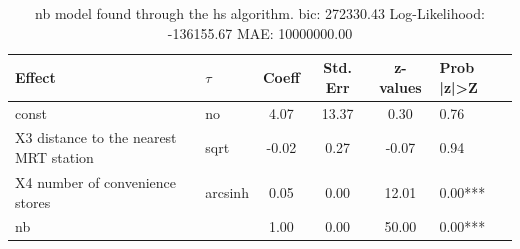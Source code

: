\begin{table}
	\caption{nb model found through the hs algorithm. bic: 272330.43 Log-Likelihood: -136155.67 MAE: 10000000.00}
	\begin{center}
		\begin{tabular}{|l|l|c|c|c|l|}
			\hline
			Effect & $\tau$ & Coeff & Std. Err & z-values & Prob |z|>Z \\
			\hline
			const & no & 4.07 & 13.37 & 0.30 & 0.76 \\
			\hline
			X3 distance to the nearest MRT station & sqrt & -0.02 & 0.27 & -0.07 & 0.94 \\
			\hline
			X4 number of convenience stores & arcsinh & 0.05 & 0.00 & 12.01 & 0.00*** \\
			\hline
			nb &  & 1.00 & 0.00 & 50.00 & 0.00*** \\
			\hline
		\end{tabular}
	\end{center}
\end{table}